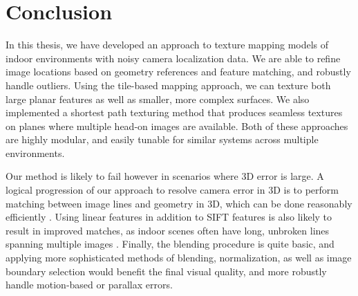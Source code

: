 \documentclass[]{spie}  %
\begin{document}
\section{Conclusion}
\label{sec:conclusion}

In this thesis, we have developed an approach to texture mapping
models of indoor environments with noisy camera localization data. We
are able to refine image locations based on geometry references and
feature matching, and robustly handle outliers. Using the tile-based
mapping approach, we can texture both large planar features as well as
smaller, more complex surfaces. We also implemented a shortest path
texturing method that produces seamless textures on planes where
multiple head-on images are available. Both of these approaches are
highly modular, and easily tunable for similar systems across multiple
environments.

Our method is likely to fail however in scenarios where 3D error is
large. A logical progression of our approach to resolve camera error
in 3D is to perform matching between image lines and geometry in 3D,
which can be done reasonably efficiently \cite{linebased,
  rectangularstructures}. Using linear features in addition to SIFT
features is also likely to result in improved matches, as indoor
scenes often have long, unbroken lines spanning multiple images
\cite{linearposeestimation}. Finally, the blending procedure is quite
basic, and applying more sophisticated methods of blending,
normalization, as well as image boundary selection would benefit the
final visual quality, and more robustly handle motion-based or
parallax errors.
\end{document}
